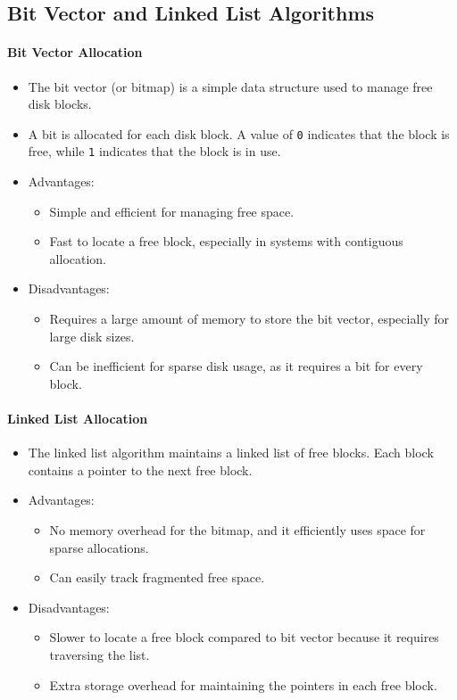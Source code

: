 \subsection{Bit Vector and Linked List Algorithms}

\paragraph{Bit Vector Allocation}
\begin{itemize}
    \item The bit vector (or bitmap) is a simple data structure used to manage free disk blocks.
    \item A bit is allocated for each disk block. A value of \texttt{0} indicates that the block is free, while \texttt{1} indicates that the block is in use.
    \item Advantages:
    \begin{itemize}
        \item Simple and efficient for managing free space.
        \item Fast to locate a free block, especially in systems with contiguous allocation.
    \end{itemize}
    \item Disadvantages:
    \begin{itemize}
        \item Requires a large amount of memory to store the bit vector, especially for large disk sizes.
        \item Can be inefficient for sparse disk usage, as it requires a bit for every block.
    \end{itemize}
\end{itemize}

\paragraph{Linked List Allocation}
\begin{itemize}
    \item The linked list algorithm maintains a linked list of free blocks. Each block contains a pointer to the next free block.
    \item Advantages:
    \begin{itemize}
        \item No memory overhead for the bitmap, and it efficiently uses space for sparse allocations.
        \item Can easily track fragmented free space.
    \end{itemize}
    \item Disadvantages:
    \begin{itemize}
        \item Slower to locate a free block compared to bit vector because it requires traversing the list.
        \item Extra storage overhead for maintaining the pointers in each free block.
    \end{itemize}
\end{itemize}
